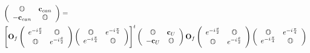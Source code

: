 \documentclass[aps,preprint]{revtex4}%
\begin{document}
\begin{align*}
&  \left(
\begin{array}
[c]{cc}%
\mathbb{O} & \mathbf{c}_{can}\\
-\mathbf{c}_{can} & \mathbb{O}%
\end{array}
\right)  =\\
&  \left[  \mathbf{O}_{f}\left(
\begin{array}
[c]{cc}%
e^{-i\frac{\mathbf{\theta}}{2}} & \mathbb{O}\\
\mathbb{O} & e^{-i\frac{\mathbf{\theta}}{2}}%
\end{array}
\right)  \left(
\begin{array}
[c]{cc}%
\mathbb{O} & e^{-i\frac{\mathbf{\pi}}{4}}\\
e^{-i\frac{\mathbf{\pi}}{4}} & \mathbb{O}%
\end{array}
\right)  \right]  ^{t}\left(
\begin{array}
[c]{cc}%
\mathbb{O} & \mathbf{c}_{U}\\
-\mathbf{c}_{U} & \mathbb{O}%
\end{array}
\right)  \mathbf{O}_{f}\left(
\begin{array}
[c]{cc}%
e^{-i\frac{\mathbf{\theta}}{2}} & \mathbb{O}\\
\mathbb{O} & e^{-i\frac{\mathbf{\theta}}{2}}%
\end{array}
\right)  \left(
\begin{array}
[c]{cc}%
\mathbb{O} & e^{-i\frac{\mathbf{\pi}}{4}}\\
e^{-i\frac{\mathbf{\pi}}{4}} & \mathbb{O}%
\end{array}
\right)
\end{align*}%
\end{document}
